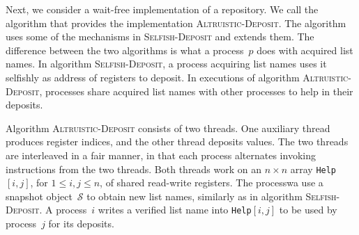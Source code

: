 \documentclass[11pt]{article}
\newcommand{\cS}{\mathcal{S}}
\begin{document}
Next, we consider a wait-free implementation of a repository.
We call the algorithm that provides the implementation \textsc{Altruistic-Deposit}.
The algorithm uses some of the mechanisms in  \textsc{Selfish-Deposit} and extends them.
The difference between the two algorithms is what a process~$p$ does with acquired list names.
In algorithm \textsc{Selfish-Deposit}, a process acquiring list names uses it selfishly as address of registers to deposit.
In executions of algorithm \textsc{Altruistic-Deposit}, processes share acquired list names  with other processes to help in their deposits.

Algorithm \textsc{Altruistic-Deposit} consists of two threads. 
One auxiliary thread produces register indices, and the other thread  deposits values.
The two threads are interleaved in a fair manner, in that each process alternates invoking  instructions from the two threads.
Both threads work on an $n\times n$ array \texttt{Help}$[i,j]$, for $1\le i,j\le n$, of shared read-write registers.
The processwa use a snapshot object~$\cS$ to obtain new list names, similarly as in algorithm \textsc{Selfish-Deposit}.
A process~$i$ writes  a verified list name  into \texttt{Help}$[i,j]$  to be used by process~$j$ for its deposits.
\end{document}

